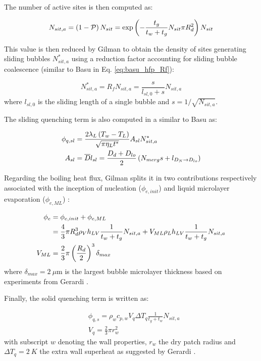 The number of active sites is then computed as:

\begin{equation}
N_{sit,a} = \left( 1-\mathcal{P} \right)N_{sit} = \mathrm{exp}\left( -\dfrac{t_{g}}{t_{w}+t_{g}}N_{sit}\pi R_{d}^{2} \right) N_{sit}
\label{eq:gilman_hfp_nsita}
\end{equation}

This value is then reduced by Gilman to obtain the density of sites generating sliding bubbles $N_{sit,a}^{*}$ using a reduction factor accounting for sliding bubble coalescence (similar to Basu \etal in Eq. \ref{eq:basu_hfp_Rf}):

\begin{equation}
N_{sit,a}^{*}=R_{f}N_{sit,a} = \frac{s}{l_{sl,0}+s} N_{sit,a}
\end{equation}
where $l_{sl,0}$ is the sliding length of a single bubble and $s=1/\sqrt{N_{sit,a}}$.


The sliding quenching term is also computed in a similar to Basu \etal as:

\begin{align}
\phi_{q,sl}&=\frac{2\lambda_{L}\parth{T_{w}-T_{L}}}{\sqrt{\pi \eta_{L}t^{*}}}A_{sl}N_{sit,a}^{*}
\label{eq:gilman_hfp_phiq} \\
%
A_{sl} &= \overline{D}l_{sl} = \frac{D_{d}+D_{lo}}{2}\parth{N_{merg}s+l_{D_{N}\rightarrow D_{lo}}}
\end{align}

Regarding the boiling heat flux, Gilman splits it in two contributions respectively associated with the inception of nucleation ($\phi_{e,init}$) and liquid microlayer evaporation ($\phi_{e,ML}$) :

\begin{align}
\phi_{e} &= \phi_{e,init} + \phi_{e,ML} \\
%
&= \frac{4}{3}\pi R_{d}^{3}\rho_{V} h_{LV} \frac{1}{t_{w}+t_{g}}N_{sit,a} + V_{ML} \rho_{L}h_{LV} \frac{1}{t_{w}+t_{g}}N_{sit,a}\\
%
V_{ML} &= \frac{2}{3}\pi \parth{\frac{R_{d}}{2}}^{3}\delta_{max}
\end{align}
where $\delta_{max}=2\ \mu\text{m}$ is the largest bubble microlayer thickness based on experiments from Gerardi \cite{gerardi_investigation_2009}.

\npar

Finally, the solid quenching term is written as:

\begin{align}
& \phi_{q,s} = \rho_{w} c_{p,w} V_{q} \Delta T_{q} \frac{1}{t_{g}+t_{w}} N_{sit,a}\\
%
& V_{q} = \frac{2}{3} \pi r_{w}^{2}
\end{align}
with subscript $w$ denoting the wall properties, $r_{w}$ the dry patch radius and $\Delta T_{q}=2\ K$ the extra wall superheat as suggested by Gerardi \etal \cite{gerardi_study_2010}.

